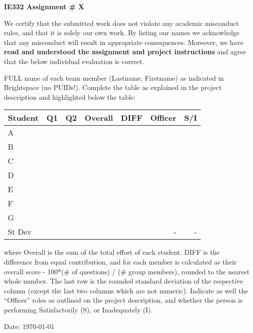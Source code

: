 \documentclass[11pt]{article}
\begin{document}
\vspace*{0.5in}

\begin{center}
\Huge{{\bf IE332 Assignment \# X}}
\end{center}

\vspace{0.3in}

\noindent We certify that the submitted work does not violate any academic misconduct rules, and that it is solely our own work. By listing our names we acknowledge that any misconduct will result in appropriate consequences.  Moreover, we have {\bf read and understood the assignment and project instructions} and agree that the below individual evaluation is correct.

\vspace{0.2in}


\vspace{0.3in}

\noindent FULL name of each team member (Lastname, Firstname) as indicated in Brightspace (no PUIDs!). Complete the table as explained in the project description and highlighted below the table:

\vspace{0.1in}

{\small
\begin{tabular}{l | c c | c c || r r }
Student & Q1 & Q2 & Overall & DIFF & Officer & S/I \\
\hline
A &  &  &  &  & & \\
B &  &  &  &  & & \\
C &  &  &  &  & & \\
D &  &  &  &  & & \\
E &  &  &  &  & & \\
F &  &  &  &  & & \\
G &  &  &  &  & & \\
\hline 
St Dev &  &  &  & & - & - \\
\hline
\end{tabular}}

\vspace{0.2in}

\noindent where Overall is the sum of the total effort of each student. DIFF is the difference from equal contribution, and for each member is calculated as their overall score - 100*(\# of questions) / (\# group members), rounded to the nearest whole number. The last row is the rounded standard deviation of the respective column (except the last two columns which are not numeric). Indicate as well the ``Officer'' roles as outlined on the project description, and whether the person is performing Satisfactorily (S), or Inadequately (I).

\vspace{0.2in}

\noindent Date: \today

\setcounter{page}{1}
\end{document}
